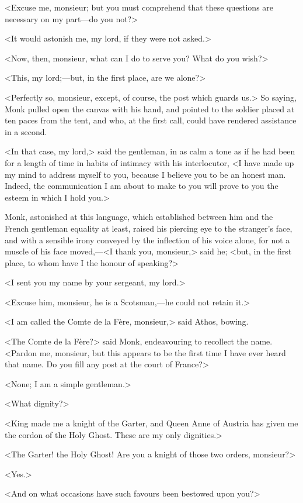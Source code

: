 <Excuse me, monsieur; but you must comprehend that these questions are necessary on my part—do you not?>

<It would astonish me, my lord, if they were not asked.>

<Now, then, monsieur, what can I do to serve you? What do you wish?>

<This, my lord;—but, in the first place, are we alone?>

<Perfectly so, monsieur, except, of course, the post which guards us.> So saying, Monk pulled open the canvas with his hand, and pointed to the soldier placed at ten paces from the tent, and who, at the first call, could have rendered assistance in a second.

<In that case, my lord,> said the gentleman, in as calm a tone as if he had been for a length of time in habits of intimacy with his interlocutor, <I have made up my mind to address myself to you, because I believe you to be an honest man. Indeed, the communication I am about to make to you will prove to you the esteem in which I hold you.>

Monk, astonished at this language, which established between him and the French gentleman equality at least, raised his piercing eye to the stranger's face, and with a sensible irony conveyed by the inflection of his voice alone, for not a muscle of his face moved,—<I thank you, monsieur,> said he; <but, in the first place, to whom have I the honour of speaking?>

<I sent you my name by your sergeant, my lord.>

<Excuse him, monsieur, he is a Scotsman,—he could not retain it.>

<I am called the Comte de la Fère, monsieur,> said Athos, bowing.

<The Comte de la Fère?> said Monk, endeavouring to recollect the name. <Pardon me, monsieur, but this appears to be the first time I have ever heard that name. Do you fill any post at the court of France?>

<None; I am a simple gentleman.>

<What dignity?>

<King  made me a knight of the Garter, and Queen Anne of Austria has given me the cordon of the Holy Ghost. These are my only dignities.>

<The Garter! the Holy Ghost! Are you a knight of those two orders, monsieur?>

<Yes.>

<And on what occasions have such favours been bestowed upon you?>

